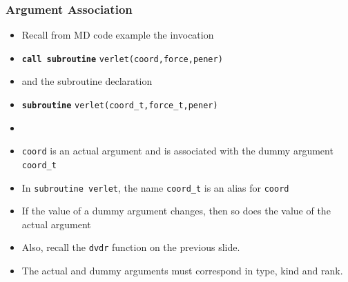 \documentclass[slidestop,mathserif,compress,xcolor=svgnames]{beamer}
\begin{document}
\begin{frame}
  \frametitle{\small Argument Association}
  \begin{itemize}
    \item Recall from MD code example the invocation
    \item[] \textbf{\texttt{call subroutine}} \texttt{verlet(coord,force,pener)}
    \item and the subroutine declaration
    \item[] \textbf{\texttt{subroutine}} \texttt{verlet(coord\_t,force\_t,pener)}
    \item[]
    \item {\texttt{coord}} is an actual argument and is associated with the dummy argument {\texttt{coord\_t}}
    \item In {\texttt{subroutine verlet}}, the name {\texttt{coord\_t}} is an alias for {\texttt{coord}}
    \item If the value of a dummy argument changes, then so does the value of the actual argument
    \item Also, recall the {\texttt{dvdr}} function on the previous slide.
    \item {\color{red}The actual and dummy arguments must correspond in type, kind and rank.}
  \end{itemize}
\end{frame}
\end{document}

